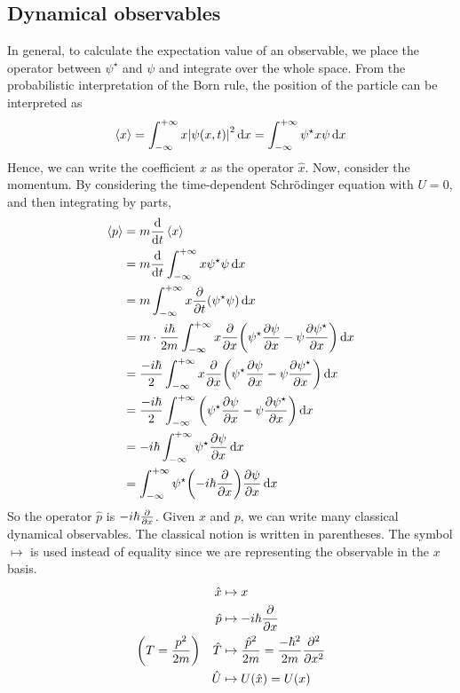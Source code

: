 \subsection{Dynamical observables}
In general, to calculate the expectation value of an observable, we place the operator between \( \psi^\star \) and \( \psi \) and integrate over the whole space.
From the probabilistic interpretation of the Born rule, the position of the particle can be interpreted as
\[
	\left\langle{x}\right\rangle = \int_{-\infty}^{+\infty} x \abs{\psi(x,t)}^2 \dd{x} = \int_{-\infty}^{+\infty} \psi^\star x \psi \dd{x}
\]
Hence, we can write the coefficient \( x \) as the operator \( \hat x \).
Now, consider the momentum.
By considering the time-dependent Schr\"odinger equation with \( U = 0 \), and then integrating by parts,
\begin{align*}
	\left\langle{p}\right\rangle & = m \dv{t} \left\langle{x}\right\rangle                                                                                                              \\
	          & = m \dv{t} \int_{-\infty}^{+\infty} x \psi^\star \psi \dd{x}                                                                      \\
	          & = m \int_{-\infty}^{+\infty} x \pdv{t} \qty( \psi^\star \psi ) \dd{x}                                                             \\
	          & = m \cdot \frac{i \hbar}{2m} \int_{-\infty}^{+\infty} x \pdv{x}\qty( \psi^\star \pdv{\psi}{x} - \psi \pdv{\psi^\star}{x} ) \dd{x} \\
	          & = \frac{-i \hbar}{2} \int_{-\infty}^{+\infty} x \pdv{x}\qty( \psi^\star \pdv{\psi}{x} - \psi \pdv{\psi^\star}{x} ) \dd{x}         \\
	          & = \frac{-i \hbar}{2} \int_{-\infty}^{+\infty} \qty( \psi^\star \pdv{\psi}{x} - \psi \pdv{\psi^\star}{x} ) \dd{x}                  \\
	          & = -i \hbar \int_{-\infty}^{+\infty} \psi^\star \pdv{\psi}{x} \dd{x}                                                               \\
	          & = \int_{-\infty}^{+\infty} \psi^\star \qty(-i \hbar \pdv{x} ) \pdv{\psi}{x} \dd{x}
\end{align*}
So the operator \( \hat p \) is \( -i \hbar \pdv{x} \).
Given \( x \) and \( p \), we can write many classical dynamical observables.
The classical notion is written in parentheses.
The symbol \( \mapsto \) is used instead of equality since we are representing the observable in the \( x \) basis.
\begin{align*}
	\hat x                               & \mapsto x                                                    \\
	\hat p                               & \mapsto -i\hbar \pdv{x}                                      \\
	\qty(T = \frac{p^2}{2m})\quad \hat T & \mapsto \frac{\hat p^2}{2m} = \frac{-\hbar^2}{2m} \pdv[2]{x} \\
	\hat U                               & \mapsto U(\hat x) = U(x)
\end{align*}

